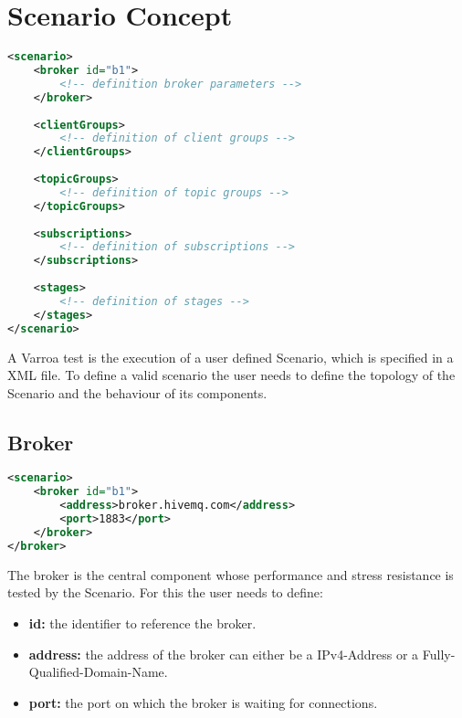 \chapter{Scenario Concept}



\begin{lstlisting}[caption={XML Definition of the Scenario}, captionpos=b, label={lst:scenario}, language=XML]
<scenario>
	<broker id="b1">
		<!-- definition broker parameters -->
	</broker>
	
	<clientGroups>
		<!-- definition of client groups -->
	</clientGroups>
	
	<topicGroups>
		<!-- definition of topic groups -->
	</topicGroups>
	
	<subscriptions>
		<!-- definition of subscriptions -->
	</subscriptions>
	
	<stages>
		<!-- definition of stages -->
	</stages>
</scenario>
\end{lstlisting}

A Varroa test is the execution of a user defined Scenario, which is specified in a XML file.
To define a valid scenario the user needs to define the topology of the Scenario and the behaviour of its components.

\section{Broker}
\begin{lstlisting}[caption={XML definition of the Broker}, captionpos=b, label={lst:broker}, language=XML]
<scenario>
	<broker id="b1">
		<address>broker.hivemq.com</address>
		<port>1883</port>
	</broker>
</broker>
\end{lstlisting}
The broker is the central component whose performance and stress resistance is tested by the Scenario.
For this the user needs to define:
\begin{itemize}
	\item \textbf{id:} the identifier to reference the broker.
	\item \textbf{address:} the address of the broker can either be a IPv4-Address or a Fully-Qualified-Domain-Name.
	\item \textbf{port:} the port on which the broker is waiting for connections.
\end{itemize}

